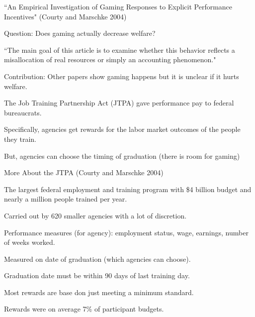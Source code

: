 \documentclass[aspectratio=169,usenames,dvipsnames]{beamer}
\newenvironment{wideitemize}{\itemize\addtolength{\itemsep}{10pt}}{\enditemize}
\begin{document}
\begin{frame}{``An Empirical Investigation of Gaming Responses to Explicit Performance Incentives" (Courty and Marschke 2004)}

\begin{wideitemize}
    \item Question: Does gaming actually decrease welfare?
    \begin{wideitemize}
        \item ``The main goal of this article is to examine whether this behavior reflects a misallocation of real resources or simply an accounting phenomenon."
    \end{wideitemize}
    \item Contribution: Other papers show gaming happens but it is unclear if it hurts welfare.
    \item The Job Training Partnership Act (JTPA) gave performance pay to federal bureaucrats.
    \item Specifically, agencies get rewards for the labor market outcomes of the people they train.
    \item But, agencies can choose the timing of graduation (there is room for gaming)
\end{wideitemize}
\end{frame}

\begin{frame}{More About the JTPA (Courty and Marschke 2004)}

\begin{wideitemize}
    \item The largest federal employment and training program with \$4 billion budget and nearly a million people trained per year.

    \item Carried out by 620 smaller agencies with a lot of discretion.
    \item Performance measures (for agency): employment status, wage, earnings, number of weeks worked.
    \item Measured on date of graduation (which agencies can choose).
    \item Graduation date must be within 90 days of last training day.
    \item Most rewards are base don just meeting a minimum standard.
    \item Rewards were on average 7\% of participant budgets.
\end{wideitemize}
\end{frame}
\end{document}
